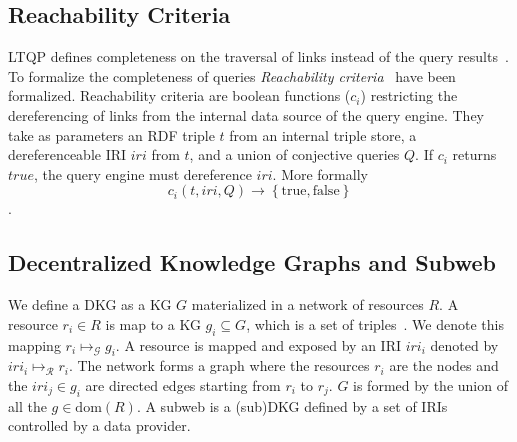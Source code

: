 \subsection{Reachability Criteria}

LTQP defines completeness on the traversal of links instead of the query results~\cite{Hartig2012}.
To formalize the completeness of queries \emph{Reachability criteria}~\cite{Hartig2012} have been formalized.
Reachability criteria are boolean functions ($c_i$) restricting the dereferencing of links from the internal data source of the query engine.
They take as parameters an RDF triple $t$ from an internal triple store, a dereferenceable IRI $iri$ from $t$, and a union of conjective queries $Q$.
If $c_i$ returns $true$, the query engine must dereference $iri$.
More formally
\begin{equation}\label{eq:reachabilityCriteria}
c_i(t, iri, Q) \rightarrow \left\{ \mathrm{true}, \mathrm{false} \right\}
\end{equation}
.

\subsection{Decentralized Knowledge Graphs and Subweb}\label{sec:dkg}

We define a DKG as a KG $G$ materialized in a network of resources $R$.
A resource $r_i \in R$ is map to a KG $g_i \subseteq G$, which is a set of triples~\cite{w3ConceptsAbstract}.
We denote this mapping $r_i \mapsto_{\mathcal{G}} g_i$.
A resource is mapped and exposed by an IRI $iri_i$ denoted by $iri_i \mapsto_{\mathcal{R}} r_i$.
The network forms a graph where the resources $r_i$ are the nodes and the $iri_j \in g_i$ are directed edges starting from $r_i$ to $r_j$.
$G$ is formed by the union of all the $g \in \text{dom}(R)$. %
A subweb is a (sub)DKG defined by a set of IRIs controlled by a data provider.